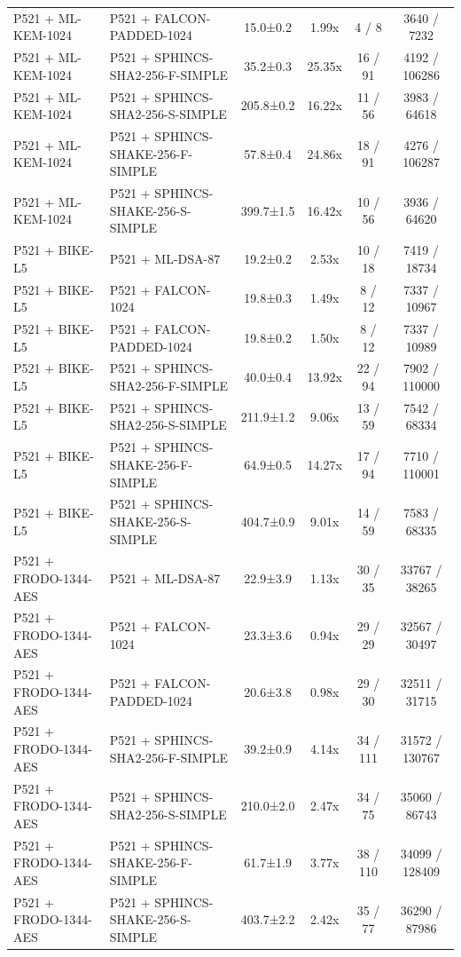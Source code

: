 \documentclass[10pt]{article}
\begin{document}
\begin{tabular}{@{}l l c c c c@{}}
P521 + ML-KEM-1024 & P521 + FALCON-PADDED-1024 & 15.0±0.2 & 1.99x & 4 / 8 & 3640 / 7232 \\
P521 + ML-KEM-1024 & P521 + SPHINCS-SHA2-256-F-SIMPLE & 35.2±0.3 & 25.35x & 16 / 91 & 4192 / 106286 \\
P521 + ML-KEM-1024 & P521 + SPHINCS-SHA2-256-S-SIMPLE & 205.8±0.2 & 16.22x & 11 / 56 & 3983 / 64618 \\
P521 + ML-KEM-1024 & P521 + SPHINCS-SHAKE-256-F-SIMPLE & 57.8±0.4 & 24.86x & 18 / 91 & 4276 / 106287 \\
P521 + ML-KEM-1024 & P521 + SPHINCS-SHAKE-256-S-SIMPLE & 399.7±1.5 & 16.42x & 10 / 56 & 3936 / 64620 \\
P521 + BIKE-L5 & P521 + ML-DSA-87 & 19.2±0.2 & 2.53x & 10 / 18 & 7419 / 18734 \\
P521 + BIKE-L5 & P521 + FALCON-1024 & 19.8±0.3 & 1.49x & 8 / 12 & 7337 / 10967 \\
P521 + BIKE-L5 & P521 + FALCON-PADDED-1024 & 19.8±0.2 & 1.50x & 8 / 12 & 7337 / 10989 \\
P521 + BIKE-L5 & P521 + SPHINCS-SHA2-256-F-SIMPLE & 40.0±0.4 & 13.92x & 22 / 94 & 7902 / 110000 \\
P521 + BIKE-L5 & P521 + SPHINCS-SHA2-256-S-SIMPLE & 211.9±1.2 & 9.06x & 13 / 59 & 7542 / 68334 \\
P521 + BIKE-L5 & P521 + SPHINCS-SHAKE-256-F-SIMPLE & 64.9±0.5 & 14.27x & 17 / 94 & 7710 / 110001 \\
P521 + BIKE-L5 & P521 + SPHINCS-SHAKE-256-S-SIMPLE & 404.7±0.9 & 9.01x & 14 / 59 & 7583 / 68335 \\
P521 + FRODO-1344-AES & P521 + ML-DSA-87 & 22.9±3.9 & 1.13x & 30 / 35 & 33767 / 38265 \\
P521 + FRODO-1344-AES & P521 + FALCON-1024 & 23.3±3.6 & 0.94x & 29 / 29 & 32567 / 30497 \\
P521 + FRODO-1344-AES & P521 + FALCON-PADDED-1024 & 20.6±3.8 & 0.98x & 29 / 30 & 32511 / 31715 \\
P521 + FRODO-1344-AES & P521 + SPHINCS-SHA2-256-F-SIMPLE & 39.2±0.9 & 4.14x & 34 / 111 & 31572 / 130767 \\
P521 + FRODO-1344-AES & P521 + SPHINCS-SHA2-256-S-SIMPLE & 210.0±2.0 & 2.47x & 34 / 75 & 35060 / 86743 \\
P521 + FRODO-1344-AES & P521 + SPHINCS-SHAKE-256-F-SIMPLE & 61.7±1.9 & 3.77x & 38 / 110 & 34099 / 128409 \\
P521 + FRODO-1344-AES & P521 + SPHINCS-SHAKE-256-S-SIMPLE & 403.7±2.2 & 2.42x & 35 / 77 & 36290 / 87986 \\

\end{tabular}
\end{document}
